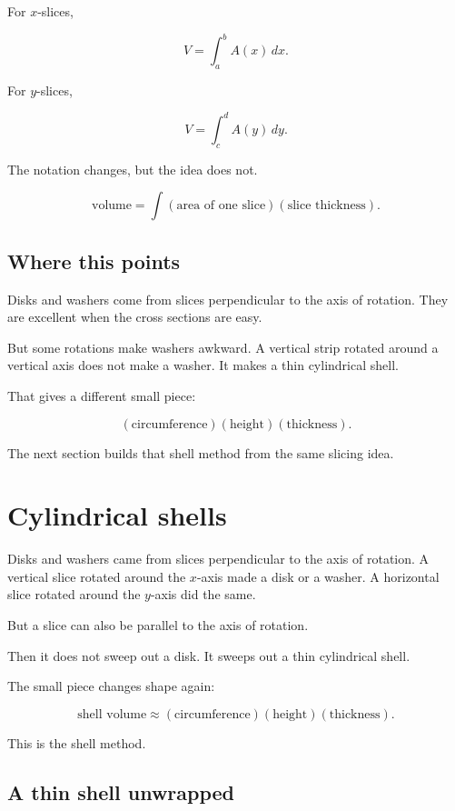 For \(x\)-slices,

\[
V=\int_a^b A(x)\,dx.
\]

For \(y\)-slices,

\[
V=\int_c^d A(y)\,dy.
\]

The notation changes, but the idea does not.

\[
\boxed{
\text{volume}=\int(\text{area of one slice})(\text{slice thickness}).
}
\]

\subsection{Where this points}
\label{subsec:volume-slicing-hook-shells}

Disks and washers come from slices perpendicular to the axis of rotation.  They are
excellent when the cross sections are easy.

But some rotations make washers awkward.  A vertical strip rotated around a vertical
axis does not make a washer.  It makes a thin cylindrical shell.

That gives a different small piece:

\[
(\text{circumference})(\text{height})(\text{thickness}).
\]

The next section builds that shell method from the same slicing idea.
\section{Cylindrical shells}
\label{sec:cylindrical-shells}

Disks and washers came from slices perpendicular to the axis of rotation.  A vertical
slice rotated around the \(x\)-axis made a disk or a washer.  A horizontal slice rotated
around the \(y\)-axis did the same.

But a slice can also be parallel to the axis of rotation.

Then it does not sweep out a disk.  It sweeps out a thin cylindrical shell.

The small piece changes shape again:

\[
\text{shell volume}
\approx
(\text{circumference})(\text{height})(\text{thickness}).
\]

This is the shell method.

\subsection{A thin shell unwrapped}
\label{subsec:thin-shell-unwrapped}

